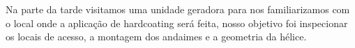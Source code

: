 \documentclass[a4paper,11pt,oneside,openany,brazilian,
version=last,draft=false,]{report}
\begin{document}
\begin{twocolumn}
% 


Na parte da tarde visitamos uma unidade geradora para nos familiarizamos com o
local onde a aplicação de hardcoating será feita, nosso objetivo foi inspecionar
os locais de acesso, a montagem dos andaimes e a geometria da hélice.



\end{twocolumn}
\end{document}
